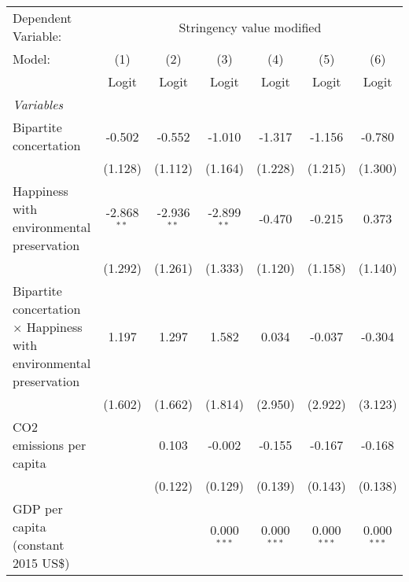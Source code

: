 
\begingroup
\centering
\begin{tabular}{lcccccc}
   \toprule
   Dependent Variable: & \multicolumn{6}{c}{Stringency value modified}\\
   Model:                                                                     & (1)           & (2)           & (3)           & (4)           & (5)           & (6)\\  
                                                                              &  Logit        & Logit         & Logit         & Logit         & Logit         & Logit\\  
   \midrule
   \emph{Variables}\\
   Bipartite concertation                                                     & -0.502        & -0.552        & -1.010        & -1.317        & -1.156        & -0.780\\   
                                                                              & (1.128)       & (1.112)       & (1.164)       & (1.228)       & (1.215)       & (1.300)\\   
   Happiness with environmental preservation                                  & -2.868$^{**}$ & -2.936$^{**}$ & -2.899$^{**}$ & -0.470        & -0.215        & 0.373\\   
                                                                              & (1.292)       & (1.261)       & (1.333)       & (1.120)       & (1.158)       & (1.140)\\   
   Bipartite concertation $\times$ Happiness with environmental preservation  & 1.197         & 1.297         & 1.582         & 0.034         & -0.037        & -0.304\\   
                                                                              & (1.602)       & (1.662)       & (1.814)       & (2.950)       & (2.922)       & (3.123)\\   
   CO2 emissions per capita                                                   &               & 0.103         & -0.002        & -0.155        & -0.167        & -0.168\\   
                                                                              &               & (0.122)       & (0.129)       & (0.139)       & (0.143)       & (0.138)\\   
   GDP per capita (constant 2015 US\$)                                        &               &               & 0.000$^{***}$ & 0.000$^{***}$ & 0.000$^{***}$ & 0.000$^{***}$\\   

\end{tabular}
